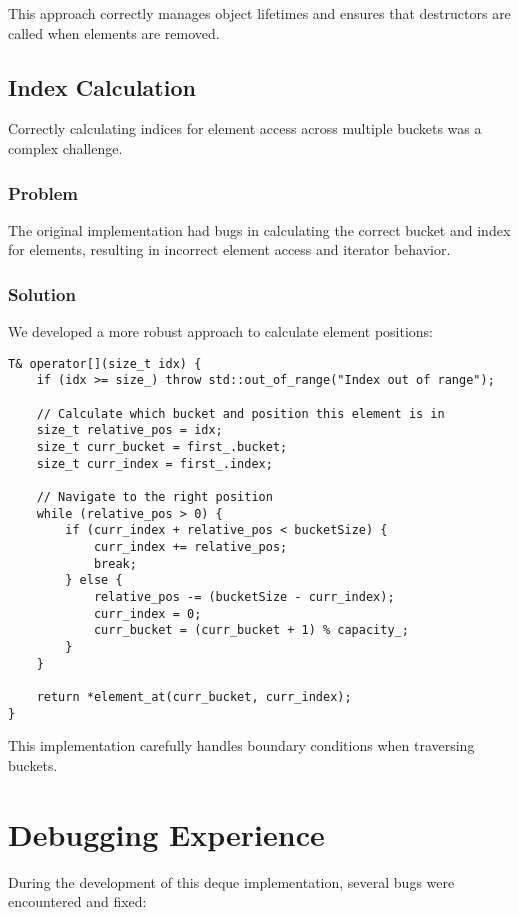 \documentclass[a4paper,12pt]{article}
\begin{document}
This approach correctly manages object lifetimes and ensures that destructors are called when elements are removed.

\subsection{Index Calculation}
Correctly calculating indices for element access across multiple buckets was a complex challenge.

\subsubsection{Problem}
The original implementation had bugs in calculating the correct bucket and index for elements, resulting in incorrect element access and iterator behavior.

\subsubsection{Solution}
We developed a more robust approach to calculate element positions:

\begin{lstlisting}
T& operator[](size_t idx) {
    if (idx >= size_) throw std::out_of_range("Index out of range");
    
    // Calculate which bucket and position this element is in
    size_t relative_pos = idx;
    size_t curr_bucket = first_.bucket;
    size_t curr_index = first_.index;
    
    // Navigate to the right position
    while (relative_pos > 0) {
        if (curr_index + relative_pos < bucketSize) {
            curr_index += relative_pos;
            break;
        } else {
            relative_pos -= (bucketSize - curr_index);
            curr_index = 0;
            curr_bucket = (curr_bucket + 1) % capacity_;
        }
    }
    
    return *element_at(curr_bucket, curr_index);
}
\end{lstlisting}

This implementation carefully handles boundary conditions when traversing buckets.

\section{Debugging Experience}

During the development of this deque implementation, several bugs were encountered and fixed:
\end{document}

